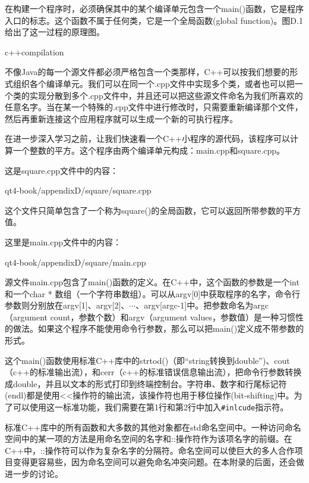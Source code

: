 \documentclass[11pt,oneside]{book}
\begin{document}
\begin{common-format}
在构建一个程序时，必须确保其中的某个编译单元包含一个main()函数，它是程序入口的标志。这个函数不属于任何类，它是一个全局函数(global function)。图D.1给出了这一过程的原理图。
\begin{fig}[0.8]{c++compilation}
\caption{C++的编译过程（在Windows中）}
\label{fig:c++compilation}
\end{fig}

不像Java的每一个源文件都必须严格包含一个类那样，C++可以按我们想要的形式组织各个编译单元。我们可以在同一个.cpp文件中实现多个类，或者也可以把一个类的实现分散到多个.cpp文件中，并且还可以把这些源文件命名为我们所喜欢的任意名字。当在某一个特殊的.cpp文件中进行修改时，只需要重新编译那个文件，然后再重新连接这个应用程序就可以生成一个新的可执行程序。

在进一步深入学习之前，让我们快速看一个C++小程序的源代码，该程序可以计算一个整数的平方。这个程序由两个编译单元构成：main.cpp和square.cpp。

这是square.cpp文件中的内容：
\begin{cppinput}{qt4-book/appendixD/square/square.cpp}
\end{cppinput}

这个文件只简单包含了一个称为square()的全局函数，它可以返回所带参数的平方值。

这里是main.cpp文件中的内容：
\begin{cppinput}{qt4-book/appendixD/square/main.cpp}
\end{cppinput}

源文件main.cpp包含了main()函数的定义。在C++中，这个函数的参数是一个int和一个char * 数组（一个字符串数组）。可以从argv[0]中获取程序的名字，命令行参数则分别放在argv[1]、argv[2]、$\cdots$、argv[argc-1]中。把参数命名为argc（argument count，参数个数）和argv（argument values，参数值）是一种习惯性的做法。如果这个程序不能使用命令行参数，那么可以把main()定义成不带参数的形式。
 
这个main()函数使用标准C++库中的strtod()（即“string转换到double”)、cout（c++的标准输出流），和cerr（c++的标准错误信息输出流），把命令行参数转换成double，并且以文本的形式打印到终端控制台。字符串、数字和行尾标记符(endl)都是使用<<操作符的输出流，该操作符也用于移位操作(bit-shifting)中。为了可以使用这一标准功能，我们需要在第1行和第2行中加入\verb+#inlcude+指示符。

标准C++库中的所有函数和大多数的其他对象都在std命名空间中。一种访问命名空间中的某一项的方法是用命名空间的名字和::操作符作为该项名字的前缀。在C++中，::操作符可以作为复杂名字的分隔符。命名空间可以使巨大的多人合作项目变得更容易些，因为命名空间可以避免命名冲突问题。在本附录的后面，还会做进一步的讨论。


\end{common-format}
\end{document}
